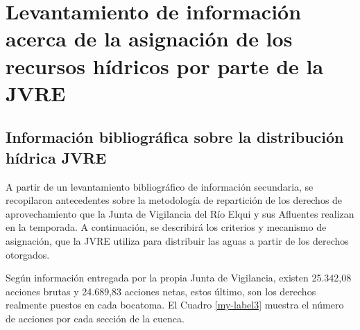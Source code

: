 \documentclass[11pt,]{article}
\begin{document}
    	
		
	


\section{Levantamiento de información acerca de la asignación de los recursos hídricos por parte de la JVRE}\bigskip





		\subsection{Información bibliográfica sobre la distribución hídrica JVRE}
	
	A partir de un levantamiento bibliográfico de información secundaria, se recopilaron antecedentes sobre la metodología de repartición de los derechos de aprovechamiento que la Junta de Vigilancia del Río Elqui y sus Afluentes realizan en la temporada. A continuación, se describirá los criterios y mecanismo de asignación, que la JVRE utiliza para distribuir las aguas a partir de los derechos otorgados. \bigskip
	
	Según información entregada por la propia Junta de Vigilancia, existen 25.342,08 acciones brutas y 24.689,83 acciones netas, estos último, son los derechos realmente puestos en cada bocatoma. El Cuadro \ref{my-label3} muestra el número de acciones por cada sección de la cuenca.\bigskip
\end{document}
